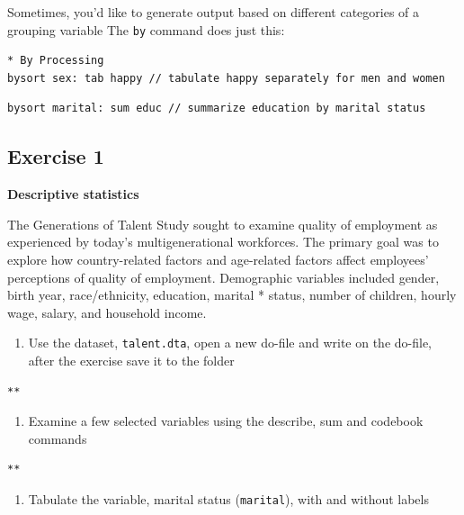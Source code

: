 \documentclass[]{book}
\providecommand{\tightlist}{%
  \setlength{\itemsep}{0pt}\setlength{\parskip}{0pt}}
\begin{document}
Sometimes, you'd like to generate output based on different categories of a grouping variable
The \texttt{by} command does just this:

\begin{verbatim}
* By Processing
bysort sex: tab happy // tabulate happy separately for men and women
\end{verbatim}

\begin{verbatim}
bysort marital: sum educ // summarize education by marital status
\end{verbatim}

\hypertarget{exercise-1-6}{%
\subsection{Exercise 1}\label{exercise-1-6}}

\textbf{Descriptive statistics}

The Generations of Talent Study sought to examine quality of employment as experienced by today's multigenerational workforces. The primary goal was to explore how country-related factors and age-related factors affect employees' perceptions of quality of employment. Demographic variables included gender, birth year, race/ethnicity, education, marital * status, number of children, hourly wage, salary, and household income.

\begin{enumerate}
\def\labelenumi{\arabic{enumi}.}
\tightlist
\item
  Use the dataset, \texttt{talent.dta}, open a new do-file and write on the do-file, after the exercise save it to the folder
\end{enumerate}

\begin{verbatim}
**
\end{verbatim}

\begin{enumerate}
\def\labelenumi{\arabic{enumi}.}
\setcounter{enumi}{1}
\tightlist
\item
  Examine a few selected variables using the describe, sum and codebook commands
\end{enumerate}

\begin{verbatim}
**
\end{verbatim}

\begin{enumerate}
\def\labelenumi{\arabic{enumi}.}
\setcounter{enumi}{2}
\tightlist
\item
  Tabulate the variable, marital status (\texttt{marital}), with and without labels
\end{enumerate}
\end{document}

